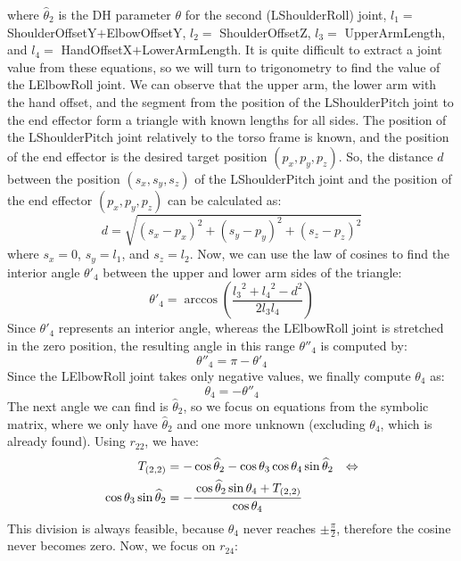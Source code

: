where $\widehat{\theta}_2$ is the DH parameter $\theta$ for the second (LShoulderRoll) joint, $l_1 =$ ShoulderOffsetY$+$ElbowOffsetY, $l_2 =$ ShoulderOffsetZ, $l_3 =$ UpperArmLength, and $l_4 =$ HandOffsetX$+$LowerArmLength.
It is quite difficult to extract a joint value from these equations, so we will turn to trigonometry to find the value of the LElbowRoll joint. We can observe that the upper arm, the lower arm with the hand offset, and the segment from the position of the LShoulderPitch joint to the end effector form a triangle with known lengths for all sides. The position of the LShoulderPitch joint relatively to the torso frame is known, and the position of the end effector is the desired target position $(p_x,p_y,p_z)$. So, the distance $d$ between the position $(s_x,s_y,s_z)$ of the LShoulderPitch joint and the position of the end effector $(p_x,p_y,p_z)$ can be calculated as:
\[
d=\sqrt{\left(s_x-p_x\right)^2 + \left(s_y-p_y\right)^2 + \left(s_z-p_z\right)^2}
\]
where $s_x = 0$, $s_y = l_1$, and $s_z = l_2$.
Now, we can use the law of cosines to find the interior angle $\theta'_4$ between the upper and lower arm sides of the triangle:
\[
\theta'_4 = \arccos\left(\frac{{l_3}^2 + {l_4}^2 - d^2}{2l_3l_4}\right)
\]
Since $\theta'_4$ represents an interior angle, whereas the LElbowRoll joint is stretched in the zero position, the resulting angle in this range $\theta''_4$ is computed by:
\[
\theta''_4 = \pi - \theta'_4
\]
Since the LElbowRoll joint takes only negative values, we finally compute $\theta_4$ as:
\[
\theta_4 = - \theta''_4
\]
The next angle we can find is $\widehat{\theta}_2$, so we focus on equations from the symbolic matrix, where we only have $\widehat{\theta}_2$ and one more unknown (excluding $\theta_4$, which is already found). Using $r_{22}$, we have:
\begin{align*}
T_{(2,2)} &= -\cos\widehat{\theta}_2 - \cos\theta_3\cos\theta_4\sin\widehat{\theta}_2 &\Leftrightarrow\\
\cos\theta_3\sin\widehat{\theta}_2 &= -\cfrac{\cos\widehat{\theta}_2\sin\theta_4 + T_{(2,2)}}{\cos\theta_4}
\end{align*}
This division is always feasible, because $\theta_4$ never reaches $\pm\frac{\pi}{2}$, therefore the cosine never becomes zero. Now, we focus on $r_{24}$:
